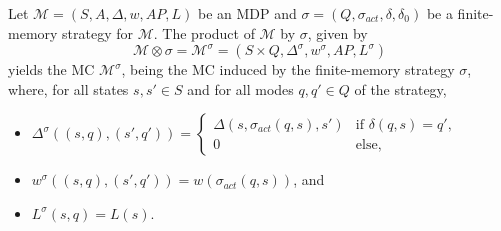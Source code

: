 \begin{definition}
Let $\mathcal{M} = (S, A, \Delta, w, AP, L)$ be an MDP and $\sigma = (Q, \sigma_{act}, \delta, \delta_0)$ be a finite-memory strategy for $\mathcal{M}$.
The product of $\mathcal{M}$ by $\sigma$, given by
\[ \mathcal{M} \otimes \sigma = \mathcal{M}^\sigma = (S \times Q, \Delta^\sigma, w^\sigma, AP, L^\sigma) \]
yields the MC $\mathcal{M}^\sigma$, being the MC induced by the finite-memory strategy $\sigma$, where,
for all states $s, s' \in S$ and for all modes $q, q' \in Q$ of the strategy,
\begin{itemize}
	\item $\Delta^\sigma((s, q), (s', q')) =
	\begin{cases}
	\Delta(s, \sigma_{act}(q, s), s') & \text{if } \delta(q, s) = q',\\
	0  & \text{else},
	\end{cases}$
  \item $w^\sigma((s, q), (s', q')) = w(\sigma_{act}(q, s))$, and
  \item $L^\sigma(s, q) = L(s)$.
\end{itemize}
\end{definition}


